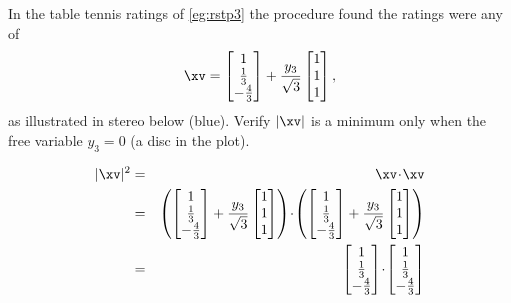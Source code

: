 \begin{example} \label{eg:}
In the table tennis ratings of \autoref{eg:rstp3} the procedure found the ratings were any of
\begin{equation*}
\xv=\begin{bmatrix} 1\\\frac13\\-\frac43 \end{bmatrix}
+\frac{y_3}{\sqrt3}\begin{bmatrix} 1\\1\\1 \end{bmatrix},
\end{equation*}
as illustrated in stereo below (blue).
Verify \(|\xv|\) is a minimum only when the free variable \(y_3=0\) (a disc in the plot).
\begin{center}
\end{center}
\begin{solution} 
\begin{eqnarray*}
|\xv|^2&=&\xv\cdot\xv
\\&=&\left(\begin{bmatrix} 1\\\frac13\\-\frac43 \end{bmatrix}
+\frac{y_3}{\sqrt3}\begin{bmatrix} 1\\1\\1 \end{bmatrix}\right)
\cdot\left(\begin{bmatrix} 1\\\frac13\\-\frac43 \end{bmatrix}
+\frac{y_3}{\sqrt3}\begin{bmatrix} 1\\1\\1 \end{bmatrix}\right)
\\&=&\begin{bmatrix} 1\\\frac13\\-\frac43 \end{bmatrix}\cdot\begin{bmatrix} 1\\\frac13\\-\frac43 \end{bmatrix}

\end{eqnarray*}
\end{solution}
\end{example}

